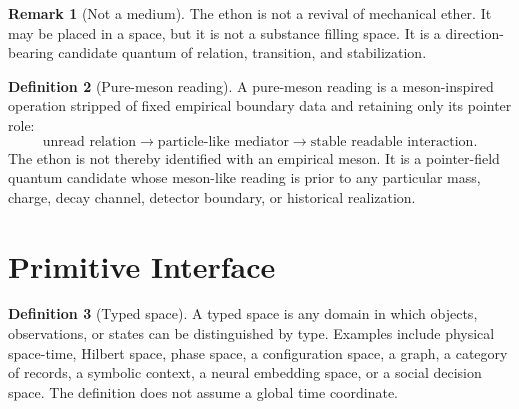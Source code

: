 \documentclass[11pt]{article}
\theoremstyle{definition}
\newtheorem{definition}{Definition}[section]
\newtheorem{remark}[definition]{Remark}
\theoremstyle{plain}
\begin{document}
\begin{remark}[Not a medium]
The ethon is not a revival of mechanical ether.  It may be placed in a
space, but it is not a substance filling space.  It is a direction-bearing
candidate quantum of relation, transition, and stabilization.
\end{remark}

\begin{definition}[Pure-meson reading]
A pure-meson reading is a meson-inspired operation stripped of fixed
empirical boundary data and retaining only its pointer role:
\[
  \text{unread relation}
  \longrightarrow
  \text{particle-like mediator}
  \longrightarrow
  \text{stable readable interaction}.
\]
The ethon is not thereby identified with an empirical meson.  It is a
pointer-field quantum candidate whose meson-like reading is prior to any
particular mass, charge, decay channel, detector boundary, or historical
realization.
\end{definition}

\section{Primitive Interface}

\begin{definition}[Typed space]
A typed space is any domain in which objects, observations, or states can
be distinguished by type.  Examples include physical space-time, Hilbert
space, phase space, a configuration space, a graph, a category of records,
a symbolic context, a neural embedding space, or a social decision space.
The definition does not assume a global time coordinate.
\end{definition}
\end{document}
